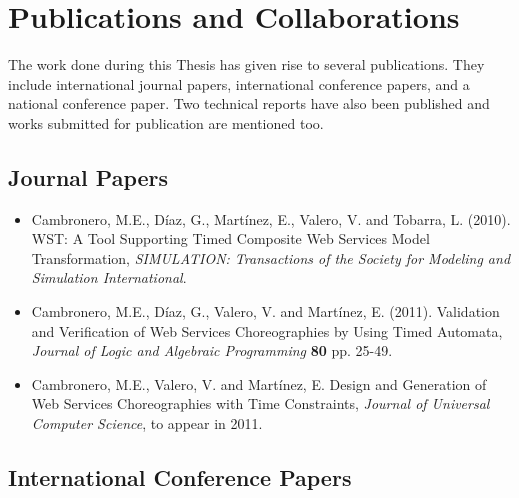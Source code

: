 \section{Publications and Collaborations}\label{publications}

The work done during this Thesis has given rise to several publications. They include international journal papers, international conference papers, and a national conference paper. Two technical reports have also been published and works submitted for publication are mentioned too.

\subsection{Journal Papers}

\begin{itemize}

\item 
Cambronero, M.E., D\'iaz, G., Mart\'inez, E., Valero, V. and Tobarra, L. (2010).
WST: A Tool Supporting Timed Composite Web Services Model Transformation, \emph{SIMULATION: Transactions of the Society for Modeling and Simulation International}.

\item 
Cambronero, M.E., D\'iaz, G., Valero, V. and Mart\'inez, E. (2011).
Validation and Verification of Web Services Choreographies by Using Timed Automata, \emph{Journal of Logic and Algebraic Programming} \textbf{80} pp. 25-49.

\item 
Cambronero, M.E., Valero, V. and Mart\'inez, E.
Design and Generation of Web Services Choreographies with Time Constraints, \emph{Journal of Universal Computer Science}, to appear in 2011.

\end{itemize}

\subsection{International Conference Papers}

